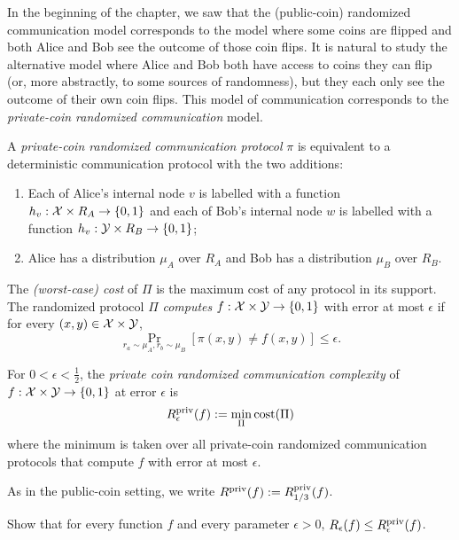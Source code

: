 In the beginning of the chapter, we saw that the (public-coin) randomized communication model corresponds to the model where some coins are flipped and both Alice and Bob see the outcome of those coin flips. It is natural to study the alternative model where Alice and Bob both have access to coins they can flip (or, more abstractly, to some sources of randomness), but they each only see the outcome of their own coin flips. This model of communication corresponds to the \emph{private-coin randomized communication} model.

\begin{definition}
A \emph{private-coin randomized communication protocol} $\pi$ is equivalent to a deterministic communication protocol with the two additions: 
\begin{enumerate}
\item Each of Alice's internal node $v$ is labelled with a function $h_v : \mathcal{X} \times R_A \to \{0,1\}$ and each of Bob's internal node $w$ is labelled with a function $h_v : \mathcal{Y} \times R_B \to \{0,1\}$; 
\item Alice has a distribution $\mu_A$ over $R_A$ and Bob has a distribution $\mu_B$ over $R_B$.
\end{enumerate}
The \emph{(worst-case) cost} of $\Pi$ is the maximum cost of any protocol in its support. The randomized protocol $\Pi$ \emph{computes} $f : \mathcal{X} \times \mathcal{Y} \to \{0,1\}$ with error at most $\epsilon$ if for every $(x,y) \in \mathcal{X} \times \mathcal{Y}$,
\[
\Pr_{r_a \sim \mu_A, r_b \sim \mu_B}[ \pi(x,y) \neq f(x,y) ] \le \epsilon.
\]
\end{definition}


\begin{definition}
For $0 < \epsilon < \frac12$, the \emph{private coin randomized communication complexity} of $f : \mathcal{X} \times \mathcal{Y} \to \{0,1\}$ at error $\epsilon$ is
\[
R^{\mathrm{priv}}_\epsilon(f) := \min_{\Pi} \mathrm{cost}(\Pi)
\]
where the minimum is taken over all private-coin randomized communication protocols that compute $f$ with error at most $\epsilon$.
\end{definition}

\begin{remark}
As in the public-coin setting, we write $R^{\mathrm{priv}}(f) := R^{\mathrm{priv}}_{1/3}(f)$.
\end{remark}
\exercises

\begin{exercise}
Show that for every function $f$ and every parameter $\epsilon > 0$, 
$R_\epsilon(f) \le R^{\mathrm{priv}}_\epsilon(f)$.
\end{exercise}

